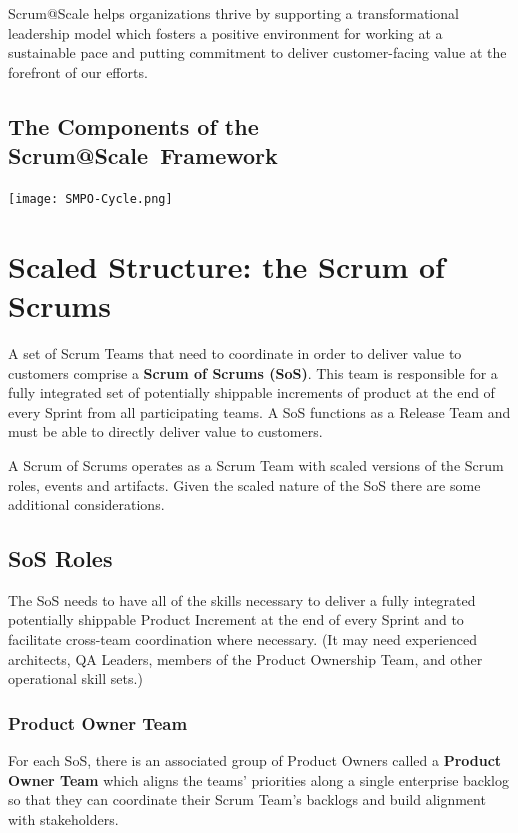 \documentclass[12pt,a4paper,parskip=full]{scrartcl}
\begin{document}
Scrum@Scale helps organizations thrive by supporting a transformational leadership model which fosters a positive environment for working at a sustainable pace and putting commitment to deliver customer-facing value at the forefront of our efforts.

\subsection{The Components of the Scrum@Scale\textregistered ~Framework}

\texttt{[image: SMPO-Cycle.png]}

\section{Scaled Structure: the Scrum of Scrums}

A set of Scrum Teams that need to coordinate in order to deliver value to customers comprise a \textbf{Scrum of Scrums (SoS)}. This team is responsible for a fully integrated set of potentially shippable increments of product at the end of every Sprint from all participating teams. A SoS functions as a Release Team and must be able to directly deliver value to customers.

A Scrum of Scrums operates as a Scrum Team with scaled versions of the Scrum roles, events and artifacts. Given the scaled nature of the SoS there are some additional considerations.

\subsection{SoS Roles}

The SoS needs to have all of the skills necessary to deliver a fully integrated potentially shippable Product Increment at the end of every Sprint and to facilitate cross-team coordination where necessary. (It may need experienced architects, QA Leaders, members of the Product Ownership Team, and other operational skill sets.) 

\subsubsection{Product Owner Team}

For each SoS, there is an associated group of Product Owners called a \textbf{Product Owner Team} which aligns the teams' priorities along a single enterprise backlog so that they can coordinate their Scrum Team's backlogs and build alignment with stakeholders.
\end{document}
